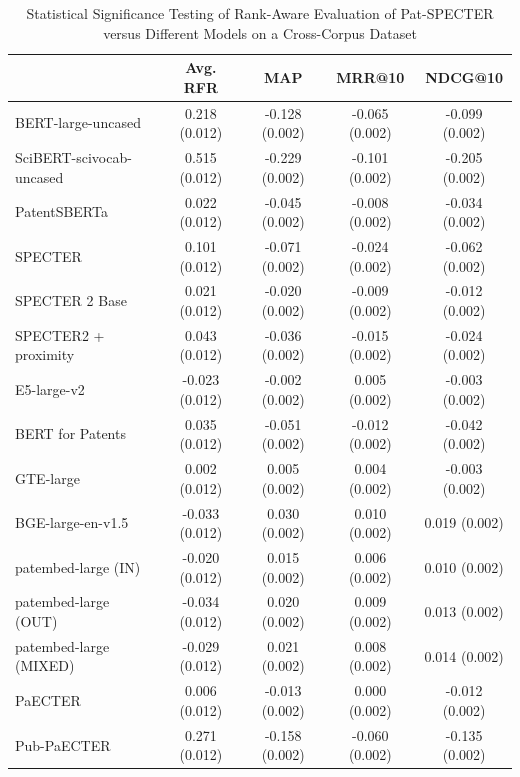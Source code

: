 \begin{table}[htbp]
\centering
\caption{Statistical Significance Testing of Rank-Aware Evaluation of Pat-SPECTER versus Different Models on a Cross-Corpus Dataset}
\begin{tabular}{lcccc}
\toprule
 & Avg. RFR & MAP & MRR@10 & NDCG@10 \\
\midrule
BERT-large-uncased & 0.218\sym{***} (0.012) & -0.128\sym{***} (0.002) & -0.065\sym{***} (0.002) & -0.099\sym{***} (0.002) \\
SciBERT-scivocab-uncased & 0.515\sym{***} (0.012) & -0.229\sym{***} (0.002) & -0.101\sym{***} (0.002) & -0.205\sym{***} (0.002) \\
PatentSBERTa & 0.022 (0.012) & -0.045\sym{***} (0.002) & -0.008\sym{***} (0.002) & -0.034\sym{***} (0.002) \\
SPECTER & 0.101\sym{***} (0.012) & -0.071\sym{***} (0.002) & -0.024\sym{***} (0.002) & -0.062\sym{***} (0.002) \\
SPECTER 2 Base & 0.021 (0.012) & -0.020\sym{***} (0.002) & -0.009\sym{***} (0.002) & -0.012\sym{***} (0.002) \\
SPECTER2 + proximity & 0.043\sym{***} (0.012) & -0.036\sym{***} (0.002) & -0.015\sym{***} (0.002) & -0.024\sym{***} (0.002) \\
E5-large-v2 & -0.023\sym{*} (0.012) & -0.002 (0.002) & 0.005\sym{*} (0.002) & -0.003 (0.002) \\
BERT for Patents & 0.035\sym{**} (0.012) & -0.051\sym{***} (0.002) & -0.012\sym{***} (0.002) & -0.042\sym{***} (0.002) \\
GTE-large & 0.002 (0.012) & 0.005\sym{*} (0.002) & 0.004 (0.002) & -0.003 (0.002) \\
BGE-large-en-v1.5 & -0.033\sym{**} (0.012) & 0.030\sym{***} (0.002) & 0.010\sym{***} (0.002) & 0.019\sym{***} (0.002) \\
patembed-large (IN) & -0.020 (0.012) & 0.015\sym{***} (0.002) & 0.006\sym{**} (0.002) & 0.010\sym{***} (0.002) \\
patembed-large (OUT) & -0.034\sym{**} (0.012) & 0.020\sym{***} (0.002) & 0.009\sym{***} (0.002) & 0.013\sym{***} (0.002) \\
patembed-large (MIXED) & -0.029\sym{*} (0.012) & 0.021\sym{***} (0.002) & 0.008\sym{***} (0.002) & 0.014\sym{***} (0.002) \\
PaECTER & 0.006 (0.012) & -0.013\sym{***} (0.002) & 0.000 (0.002) & -0.012\sym{***} (0.002) \\
Pub-PaECTER & 0.271\sym{***} (0.012) & -0.158\sym{***} (0.002) & -0.060\sym{***} (0.002) & -0.135\sym{***} (0.002) \\

\end{tabular}
\end{table}
